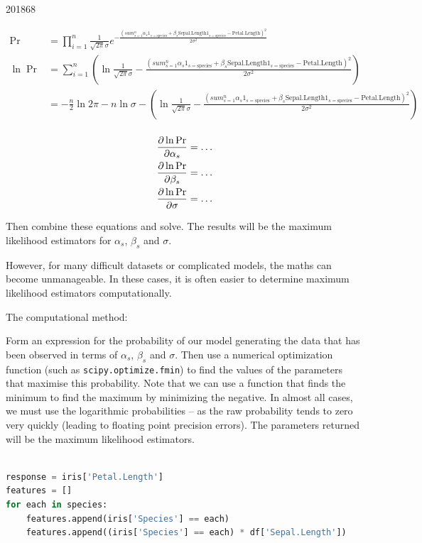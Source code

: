 \documentclass[10pt,\jkfside,a4paper]{article}
\begin{document}
\begin{examquestion}{2018}{6}{8}
\begin{enumerate}[label=(\alph*)]
\[
\begin{split}
\Pr &= \prod^n_{i=1} \frac{1}{\sqrt{2\pi}\sigma} e^{-\frac{
\left(sum^n_{s=1}\alpha_s1_{s=\text{species}} + \beta_s\text{Sepal.Length}
1_{s=\text{species}} - \text{Petal.Length}\right)^2}{2\sigma^2}} \\
\ln \Pr &= \sum^n_{i=1} \left(\ln\frac{1}{\sqrt{2\pi}\sigma} -\frac{
\left(sum^n_{s=1}\alpha_s1_{s=\text{species}} + \beta_s\text{Sepal.Length}
1_{s=\text{species}} - \text{Petal.Length}\right)^2}{2\sigma^2}\right) \\
&= -\frac{n}{2}\ln 2\pi - n\ln \sigma - \left(\ln\frac{1}{\sqrt{2\pi}\sigma} -\frac{
\left(sum^n_{s=1}\alpha_s 1_{s=\text{species}} + \beta_s\text{Sepal.Length}
1_{s=\text{species}} - \text{Petal.Length}\right)^2}{2\sigma^2}\right) \\
\end{split}
\]

\[
\begin{split}
\pdv{\ln \Pr}{\alpha_s} = \dots \\
\pdv{\ln \Pr}{\beta_s} = \dots \\
\pdv{\ln \Pr}{\sigma} = \dots \\
\end{split}
\]

Then combine these equations and solve. The results will be the maximum
likelihood estimators for $\alpha_s$, $\beta_s$ and $\sigma$.

However, for many difficult datasets or complicated models, the maths can
become unmanageable. In these cases, it is often easier to determine maximum
likelihood estimators computationally.

The computational method:

Form an expression for the probability of our model generating the data that
has been observed in terms of $\alpha_s$, $\beta_s$ and $\sigma$. Then use a
numerical optimization function (such as \texttt{scipy.optimize.fmin}) to find 
the values of the parameters that maximise this probability. Note that we can
use a function that finds the minimum to find the maximum by minimizing the
negative. In almost all cases, we must use the logarithmic probabilities --
as the raw probability tends to zero very quickly (leading to floating point
precision errors). The parameters returned will be the maximum likelihood
estimators.

\begin{lstlisting}[language=Python]

response = iris['Petal.Length']
features = []
for each in species:
	features.append(iris['Species'] == each)
	features.append((iris['Species'] == each) * df['Sepal.Length'])


\end{lstlisting}
\end{enumerate}
\end{examquestion}
\end{document}
